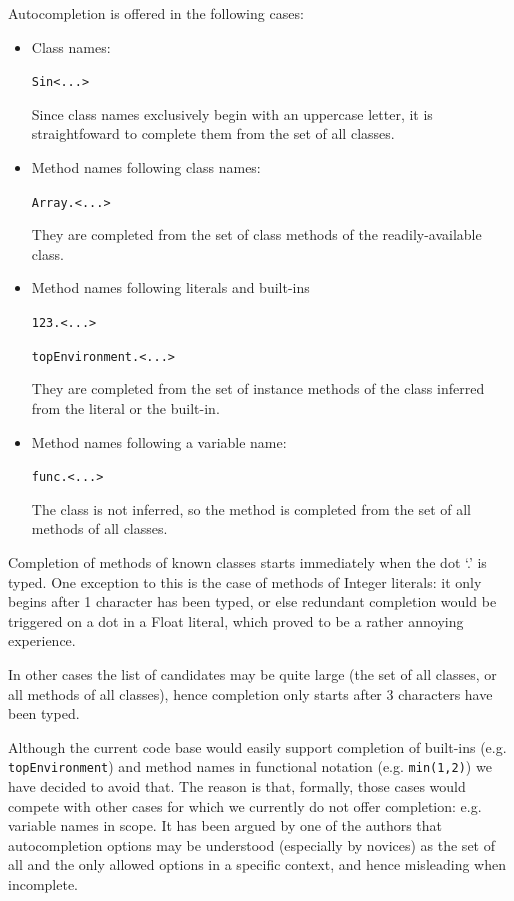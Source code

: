 \documentclass[11pt,a4paper]{article}
\begin{document}
Autocompletion is offered in the following cases:
\begin{itemize}
 \item Class names:

 \verb|Sin<...>|

 Since class names exclusively begin with an uppercase letter, it is straightfoward
 to complete them from the set of all classes.

 \item Method names following class names:

 \verb|Array.<...>|

 They are completed from the set of class methods of the
 readily-available class.

 \item Method names following literals and built-ins

 \verb|123.<...>|

 \verb|topEnvironment.<...>|

 They are completed from the set of instance methods of the class
 inferred from the literal or the built-in.

 \item Method names following a variable name:

 \verb|func.<...>|

 The class is not inferred, so the method is completed from the set of all methods of all classes.

\end{itemize}

Completion of methods of known classes starts immediately when the dot `.' is typed. One exception
to this is the case of methods of Integer literals: it only begins after 1 character has been
typed, or else redundant completion would be triggered on a dot in a Float literal, which proved
to be a rather annoying experience.

In other cases the list of candidates may be quite large (the set of all classes, or all methods of
all classes), hence completion only starts after 3 characters have been typed.

Although the current code base would easily support completion of built-ins (e.g.
\verb|topEnvironment|) and method names in functional notation (e.g. \verb|min(1,2)|) we have
decided to avoid that. The reason is that, formally, those cases would compete with other cases for
which we currently do not offer completion: e.g. variable names in scope. It has been argued by
one of the authors that autocompletion options may be understood (especially by novices) as the set
of all and the only allowed options in a specific context, and hence misleading when incomplete.
\end{document}
